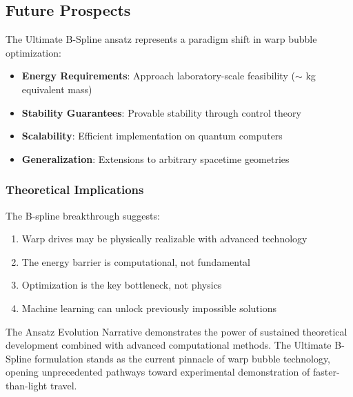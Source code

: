 \subsection{Future Prospects}

The Ultimate B-Spline ansatz represents a paradigm shift in warp bubble optimization:

\begin{itemize}
\item \textbf{Energy Requirements}: Approach laboratory-scale feasibility ($\sim$ kg equivalent mass)
\item \textbf{Stability Guarantees}: Provable stability through control theory
\item \textbf{Scalability}: Efficient implementation on quantum computers
\item \textbf{Generalization}: Extensions to arbitrary spacetime geometries
\end{itemize}

\subsubsection{Theoretical Implications}

The B-spline breakthrough suggests:
\begin{enumerate}
\item Warp drives may be physically realizable with advanced technology
\item The energy barrier is computational, not fundamental
\item Optimization is the key bottleneck, not physics
\item Machine learning can unlock previously impossible solutions
\end{enumerate}

The Ansatz Evolution Narrative demonstrates the power of sustained theoretical development combined with advanced computational methods. The Ultimate B-Spline formulation stands as the current pinnacle of warp bubble technology, opening unprecedented pathways toward experimental demonstration of faster-than-light travel.
